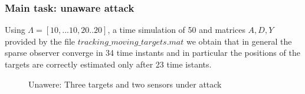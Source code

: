     \subsubsection*{Main task: unaware attack}
    Using $\Lambda = [10,...10,20..20]$, a time simulation of 50 and matrices $A,D,Y$ provided by the file $tracking\_moving\_targets.mat$ we obtain that in general the sparse observer converge in 34 time instants and in particular the positions of the targets are correctly estimated only after 23 time istants.
    
    \begin{figure}[!ht]   
        \vspace{-1cm}
        \centering 
        \caption{Unawere: Three targets and two sensors under attack}
        \label{fig:unaware_1}
    \end{figure}
    
